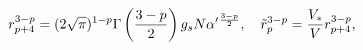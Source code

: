 \begin{equation} 
r_{p+4}^{3-p}=(2\sqrt{\pi})^{1-p}\Gamma \left(
{3-p\over 2}\right)
g_{s}N\alpha'{}^{3-p\over 2},\quad
\tilde{r}_{p}^{3-p}=
{V_{*}\over V}r_{p+4}^{3-p},
\end{equation}

